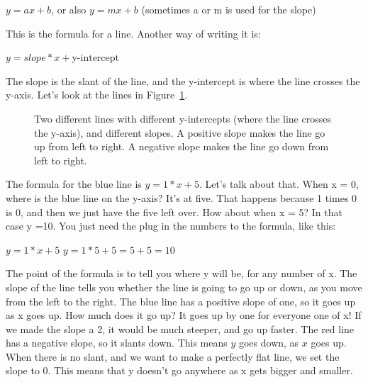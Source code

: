 \documentclass[
  letterpaper,
  DIV=11,
  numbers=noendperiod]{scrreprt}
\begin{document}
\(y = ax + b\), or also \(y = mx + b\) (sometimes a or m is used for the
slope)

This is the formula for a line. Another way of writing it is:

\(y = slope * x + \text{y-intercept}\)

The slope is the slant of the line, and the y-intercept is where the
line crosses the y-axis. Let's look at the lines in
Figure~\ref{fig-3twolines}.

\begin{figure}


\caption{\label{fig-3twolines}Two different lines with different
y-intercepts (where the line crosses the y-axis), and different slopes.
A positive slope makes the line go up from left to right. A negative
slope makes the line go down from left to right.}

\end{figure}%

The formula for the blue line is \(y = 1*x + 5\). Let's talk about that.
When x = 0, where is the blue line on the y-axis? It's at five. That
happens because 1 times 0 is 0, and then we just have the five left
over. How about when x = 5? In that case y =10. You just need the plug
in the numbers to the formula, like this:

\(y = 1*x + 5\) \(y = 1*5 + 5 = 5+5 =10\)

The point of the formula is to tell you where y will be, for any number
of x. The slope of the line tells you whether the line is going to go up
or down, as you move from the left to the right. The blue line has a
positive slope of one, so it goes up as x goes up. How much does it go
up? It goes up by one for everyone one of x! If we made the slope a 2,
it would be much steeper, and go up faster. The red line has a negative
slope, so it slants down. This means \(y\) goes down, as \(x\) goes up.
When there is no slant, and we want to make a perfectly flat line, we
set the slope to 0. This means that y doesn't go anywhere as x gets
bigger and smaller.
\end{document}
